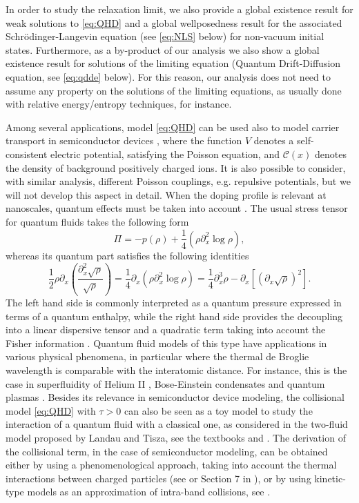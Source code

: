 \documentclass[leqno]{amsart}
\theoremstyle{plain}
\theoremstyle{definition}
\theoremstyle{remark}
\theoremstyle{plain}
\theoremstyle{plain}
\def\d{{\partial}}
\numberwithin{equation}{section}
\begin{document}
In order to study the relaxation limit, we also provide a global existence result for weak solutions to \eqref{eq:QHD} and a global wellposedness result for the associated Schr\"odinger-Langevin equation (see \eqref{eq:NLS} below) for non-vacuum initial states. 
Furthermore, as a by-product of our analysis we also show a global existence result for solutions of the limiting equation (Quantum Drift-Diffusion equation, see \eqref{eq:qdde} below).
For this reason, our analysis does not need to assume any property on the solutions of the limiting equations, as usually done with relative energy/entropy techniques, for instance.

Among several applications, model \eqref{eq:QHD} can be used also to model carrier transport in semiconductor devices \cite{J}, where the function $V$ denotes a self-consistent electric potential, satisfying the Poisson equation, and $\mathcal{C}(x)$ denotes the density of background positively charged ions.
It is also possible to consider, with similar analysis, different Poisson couplings, e.g. repulsive potentials, but we will not develop this aspect in detail.
When the doping profile is relevant at nanoscales, quantum effects must be taken into account \cite{AI, G}.
\newline
The usual stress tensor for quantum fluids takes the following form \cite{BP}
\begin{equation*}
\Pi = -p(\rho) + \frac14 (\rho\d_x^2\log\rho),
\end{equation*}
whereas its quantum part  satisfies the following identities
\begin{equation}\label{eq:bohm}
\frac12\rho\d_x\left(\frac{\d_{x}^2\sqrt{\rho}}{\sqrt{\rho}}\right)=\frac14\d_x(\rho\d_x^2\log\rho)=\frac14\d_{x}^3\rho-\d_x[(\d_x\sqrt{\rho})^2].
\end{equation}
The left hand side is commonly interpreted as a quantum pressure expressed in terms of a quantum enthalpy, while the right hand side provides the decoupling into a linear dispersive tensor and a quadratic term taking into account the Fisher information \cite{HC}.
\newline
Quantum fluid models of this type have applications in various physical phenomena, in particular where the thermal de Broglie wavelength is comparable with the interatomic distance.
For instance, this is the case in superfluidity of Helium II \cite{K}, Bose-Einstein condensates \cite{PS} and quantum plasmas \cite{H}. 
\newline 
Besides its relevance in semiconductor device modeling, the collisional model \eqref{eq:QHD} with $\tau>0$ can also be seen as a toy model to study the interaction of a quantum fluid with a classical one, as considered in the two-fluid model proposed by Landau and Tisza, see the textbooks \cite[Section 17]{K} and \cite[Chapter XVI]{LL}. 
The derivation of the collisional term, in the case of semiconductor modeling, can be obtained either by using a phenomenological approach, taking into account the thermal interactions between charged particles (see  \cite{AI,AT,G} or Section 7 in \cite{AM_b}), or by using kinetic-type models as an approximation of intra-band collisions, see \cite{BW}.
\end{document}

